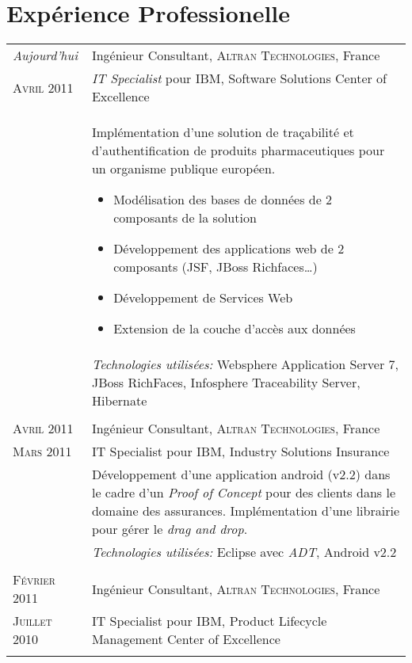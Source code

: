 \section{\texorpdfstring{\color{Blue}Expérience Professionelle}{Expérience Professionelle}}
\begin{longtable}{R{2.5cm}|p{14.8cm}}
 	\emph{Aujourd'hui} & Ingénieur Consultant, \textsc{Altran Technologies}, France\\
 	\textsc{Avril 2011}& \emph{IT Specialist} pour IBM, Software Solutions Center of Excellence\\&
 	\footnotesize{
 		Implémentation d'une solution de traçabilité et d'authentification
 	 	de produits pharmaceutiques pour un organisme publique européen.
 		\begin{itemize}
			\item Modélisation des bases de données de 2 composants de la solution
			\item Développement des applications web de 2 composants (JSF, JBoss Richfaces\ldots)
			\item Développement de Services Web
			\item Extension de la couche d'accès aux données
		\end{itemize}
		\vspace{-1em}
	}\\&
 	\footnotesize{\emph{Technologies utilisées:} Websphere Application Server 7, JBoss RichFaces, Infosphere Traceability Server, Hibernate }\\
  \\
 	\textsc{Avril 2011} & Ingénieur Consultant, \textsc{Altran Technologies}, France\\
 	\textsc{Mars 2011}& IT Specialist pour IBM, Industry Solutions Insurance\\&
 	\footnotesize{Développement d'une application android (v2.2) dans le cadre d'un \emph{Proof of Concept} 
 	pour des clients dans le domaine des assurances. Implémentation d'une librairie pour gérer le \emph{drag and drop}.}\\&
 	\footnotesize{\emph{Technologies utilisées:} Eclipse avec \emph{ADT}, Android v2.2 }\\
 \\
 	\textsc{Février 2011} & Ingénieur Consultant, \textsc{Altran Technologies}, France\\
 	\textsc{Juillet 2010}&IT Specialist pour IBM, Product Lifecycle Management Center of Excellence\\&

\end{longtable}

